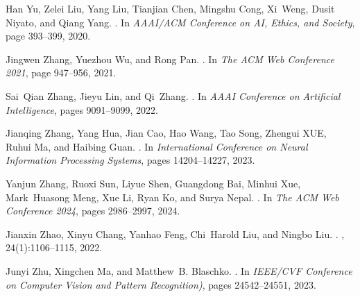 \documentclass{article}
\begin{document}
\begin{thebibliography}{}
Han Yu, Zelei Liu, Yang Liu, Tianjian Chen, Mingshu Cong, Xi~Weng, Dusit Niyato, and Qiang Yang.
.
\newblock In {\em AAAI/ACM Conference on AI, Ethics, and Society}, page 393–399, 2020.

Jingwen Zhang, Yuezhou Wu, and Rong Pan.
.
\newblock In {\em {The ACM Web Conference 2021}}, page 947–956, 2021.

Sai~Qian Zhang, Jieyu Lin, and Qi~Zhang.
.
\newblock In {\em {AAAI Conference on Artificial Intelligence}}, pages 9091--9099, 2022.

Jianqing Zhang, Yang Hua, Jian Cao, Hao Wang, Tao Song, Zhengui XUE, Ruhui Ma, and Haibing Guan.
.
\newblock In {\em {International Conference on Neural Information Processing Systems}}, pages 14204--14227, 2023.

Yanjun Zhang, Ruoxi Sun, Liyue Shen, Guangdong Bai, Minhui Xue, Mark~Huasong Meng, Xue Li, Ryan Ko, and Surya Nepal.
.
\newblock In {\em {The ACM Web Conference 2024}}, pages 2986--2997, 2024.

Jianxin Zhao, Xinyu Chang, Yanhao Feng, Chi~Harold Liu, and Ningbo Liu.
.
, 24(1):1106--1115, 2022.

Junyi Zhu, Xingchen Ma, and Matthew~B. Blaschko.
.
\newblock In {\em {IEEE/CVF Conference on Computer Vision and Pattern Recognition)}}, pages 24542--24551, 2023.

\end{thebibliography}
\end{document}

